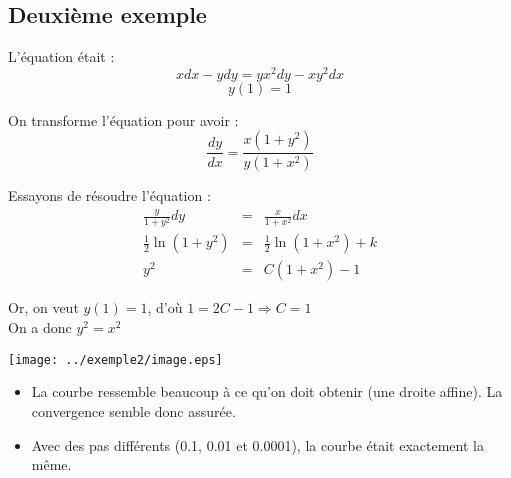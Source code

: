 \subsection{Deuxième exemple}
L'équation était :
\[xdx - ydy = yx^2dy - xy^2dx\]
\[y(1)=1\]

On transforme l'équation pour avoir :
\[\frac{dy}{dx}=\frac{x(1+y^2)}{y(1+x^2)}\]

Essayons de résoudre l'équation :
\begin{eqnarray*}
	\frac{y}{1+y^2}dy &=& \frac{x}{1+x^2} dx \\
	\frac{1}{2} \ln(1+y^2) &=& \frac{1}{2} \ln(1+x^2) + k \\
	y^2&=&C(1+x^2)-1
\end{eqnarray*}

Or, on veut $y(1)=1$, d'où $1=2C-1 \Rightarrow C=1$\\
On a donc $y^2=x^2$

\begin{center}
\texttt{[image: ../exemple2/image.eps]}
\end{center}

\begin{itemize}
	\item La courbe ressemble beaucoup à ce qu'on doit obtenir (une droite affine). La convergence semble donc assurée.
	\item Avec des pas différents (0.1, 0.01 et 0.0001), la courbe était exactement la même.
\end{itemize}
